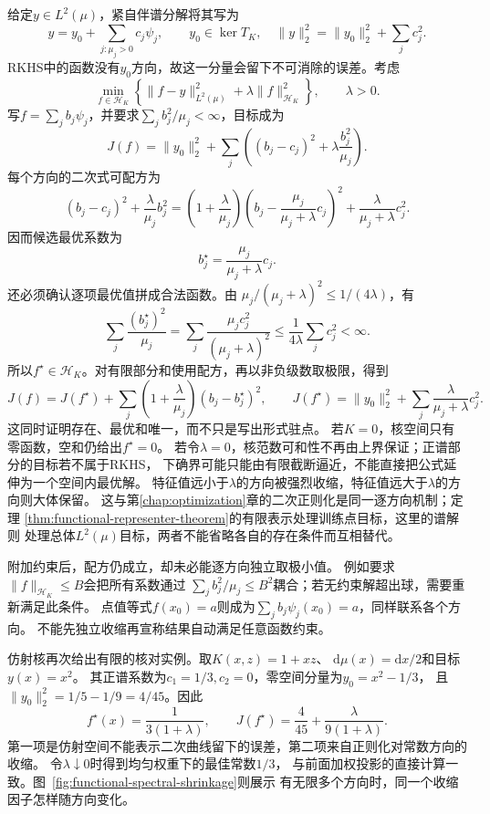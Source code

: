 给定$y\in L^2(\mu)$，紧自伴谱分解将其写为
\[
 y=y_0+\sum_{j:\mu_j>0}c_j\psi_j,\qquad
 y_0\in\ker T_K,\quad
 \lVert y\rVert_2^2=\lVert y_0\rVert_2^2+\sum_jc_j^2.
\]
RKHS中的函数没有$y_0$方向，故这一分量会留下不可消除的误差。考虑
\[
  \min_{f\in\mathcal{H}_K}
  \left\{
    \lVert f-y\rVert_{L^2(\mu)}^2
    +
    \lambda\lVert f\rVert_{\mathcal{H}_K}^2
  \right\},
  \qquad \lambda>0.
\]
写$f=\sum_jb_j\psi_j$，并要求$\sum_jb_j^2/\mu_j<\infty$，目标成为
\[
 J(f)=\lVert y_0\rVert_2^2+
 \sum_j\left((b_j-c_j)^2+\lambda\frac{b_j^2}{\mu_j}\right).
\]
每个方向的二次式可配方为
\[
 (b_j-c_j)^2+\frac{\lambda}{\mu_j}b_j^2
 =\left(1+\frac{\lambda}{\mu_j}\right)
   \left(b_j-\frac{\mu_j}{\mu_j+\lambda}c_j\right)^2
   +\frac{\lambda}{\mu_j+\lambda}c_j^2.
\]
因而候选最优系数为
\begin{equation}
  b_j^\star
  =
  \frac{\mu_j}{\mu_j+\lambda}c_j.
  \label{eq:functional-spectral-shrinkage}
\end{equation}
还必须确认逐项最优值拼成合法函数。由
$\mu_j/(\mu_j+\lambda)^2\leq1/(4\lambda)$，有
\[
 \sum_j\frac{(b_j^\star)^2}{\mu_j}
 =\sum_j\frac{\mu_j c_j^2}{(\mu_j+\lambda)^2}
 \leq\frac1{4\lambda}\sum_jc_j^2<\infty.
\]
所以$f^\star\in\mathcal H_K$。对有限部分和使用配方，再以非负级数取极限，得到
\[
 J(f)=J(f^\star)+
 \sum_j\left(1+\frac{\lambda}{\mu_j}\right)(b_j-b_j^\star)^2,\qquad
 J(f^\star)=\lVert y_0\rVert_2^2+
 \sum_j\frac{\lambda}{\mu_j+\lambda}c_j^2.
\]
这同时证明存在、最优和唯一，而不只是写出形式驻点。
若$K=0$，核空间只有零函数，空和仍给出$f^\star=0$。
若令$\lambda=0$，核范数可和性不再由上界保证；正谱部分的目标若不属于RKHS，
下确界可能只能由有限截断逼近，不能直接把公式延伸为一个空间内最优解。
特征值远小于$\lambda$的方向被强烈收缩，特征值远大于$\lambda$的方向则大体保留。
这与第\ref{chap:optimization}章的二次正则化是同一逐方向机制；定理
\ref{thm:functional-representer-theorem}的有限表示处理训练点目标，这里的谱解则
处理总体$L^2(\mu)$目标，两者不能省略各自的存在条件而互相替代。

附加约束后，配方仍成立，却未必能逐方向独立取极小值。
例如要求$\lVert f\rVert_{\mathcal H_K}\leq B$会把所有系数通过
$\sum_jb_j^2/\mu_j\leq B^2$耦合；若无约束解超出球，需要重新满足此条件。
点值等式$f(x_0)=a$则成为$\sum_jb_j\psi_j(x_0)=a$，同样联系各个方向。
不能先独立收缩再宣称结果自动满足任意函数约束。

仿射核再次给出有限的核对实例。取$K(x,z)=1+xz$、
$\mathrm d\mu(x)=\mathrm dx/2$和目标$y(x)=x^2$。
其正谱系数为$c_1=1/3,c_2=0$，零空间分量为$y_0=x^2-1/3$，
且$\lVert y_0\rVert_2^2=1/5-1/9=4/45$。因此
\[
 f^\star(x)=\frac{1}{3(1+\lambda)},\qquad
 J(f^\star)=\frac4{45}+\frac{\lambda}{9(1+\lambda)}.
\]
第一项是仿射空间不能表示二次曲线留下的误差，第二项来自正则化对常数方向的收缩。
令$\lambda\downarrow0$时得到均匀权重下的最佳常数$1/3$，
与前面加权投影的直接计算一致。图~\ref{fig:functional-spectral-shrinkage}则展示
有无限多个方向时，同一个收缩因子怎样随方向变化。

